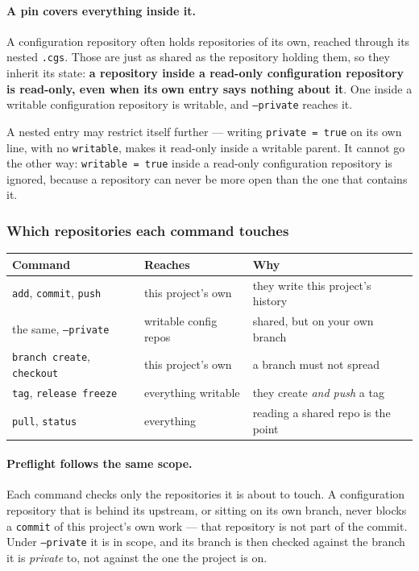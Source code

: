 \paragraph{A pin covers everything inside it.} A configuration repository
often holds repositories of its own, reached through its nested
\texttt{.cgs}. Those are just as shared as the repository holding them, so
they inherit its state: \textbf{a repository inside a read-only
configuration repository is read-only, even when its own entry says
nothing about it}. One inside a writable configuration repository is
writable, and \texttt{--private} reaches it.

A nested entry may restrict itself further --- writing \texttt{private =
true} on its own line, with no \texttt{writable}, makes it read-only
inside a writable parent. It cannot go the other way: \texttt{writable =
true} inside a read-only configuration repository is ignored, because a
repository can never be more open than the one that contains it.

\subsubsection{Which repositories each command touches}

\begin{center}
\begin{tabular}{lll}
\textbf{Command} & \textbf{Reaches} & \textbf{Why} \\
\hline
\texttt{add}, \texttt{commit}, \texttt{push}    & this project's own     & they write this project's history \\
the same, \texttt{--private}                   & writable config repos  & shared, but on your own branch \\
\texttt{branch create}, \texttt{checkout}       & this project's own     & a branch must not spread \\
\texttt{tag}, \texttt{release freeze}           & everything writable    & they create \emph{and push} a tag \\
\texttt{pull}, \texttt{status}                  & everything             & reading a shared repo is the point \\
\end{tabular}
\end{center}

\paragraph{Preflight follows the same scope.} Each command checks only
the repositories it is about to touch. A configuration repository that is
behind its upstream, or sitting on its own branch, never blocks a
\texttt{commit} of this project's own work --- that repository is not part
of the commit. Under \texttt{--private} it is in scope, and its branch is
then checked against the branch it is \emph{private} to, not against the
one the project is on.

